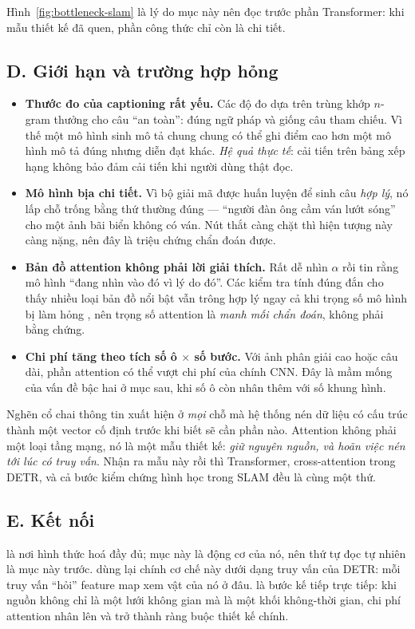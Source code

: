 \documentclass[../../../deep_learning.tex]{subfiles}
\begin{document}
Hình~\ref{fig:bottleneck-slam} là lý do mục này nên đọc trước phần Transformer: khi mẫu thiết kế đã quen, phần công thức chỉ còn là chi tiết.

\subsection{D. Giới hạn và trường hợp hỏng}

\begin{itemize}
\item \textbf{Thước đo của captioning rất yếu.} Các độ đo dựa trên trùng khớp \(n\)-gram thưởng cho câu ``an toàn'': đúng ngữ pháp và giống câu tham chiếu. Vì thế một mô hình sinh mô tả chung chung có thể ghi điểm cao hơn một mô hình mô tả đúng nhưng diễn đạt khác. \emph{Hệ quả thực tế}: cải tiến trên bảng xếp hạng không bảo đảm cải tiến khi người dùng thật đọc.
\item \textbf{Mô hình bịa chi tiết.} Vì bộ giải mã được huấn luyện để sinh câu \emph{hợp lý}, nó lấp chỗ trống bằng thứ thường đúng --- ``người đàn ông cầm ván lướt sóng'' cho một ảnh bãi biển không có ván. Nút thắt càng chặt thì hiện tượng này càng nặng, nên đây là triệu chứng chẩn đoán được.
\item \textbf{Bản đồ attention không phải lời giải thích.} Rất dễ nhìn \(\alpha\) rồi tin rằng mô hình ``đang nhìn vào đó vì lý do đó''. Các kiểm tra tính đúng đắn cho thấy nhiều loại bản đồ nổi bật vẫn trông hợp lý ngay cả khi trọng số mô hình bị làm hỏng \cite{adebayo2018sanity}, nên trọng số attention là \emph{manh mối chẩn đoán}, không phải bằng chứng.
\item \textbf{Chi phí tăng theo tích số ô \(\times\) số bước.} Với ảnh phân giải cao hoặc câu dài, phần attention có thể vượt chi phí của chính CNN. Đây là mầm mống của vấn đề bậc hai ở mục sau, khi số ô còn nhân thêm với số khung hình.
\end{itemize}

\begin{cannho}
Nghẽn cổ chai thông tin xuất hiện ở \emph{mọi} chỗ mà hệ thống nén dữ liệu có cấu trúc thành một vector cố định trước khi biết sẽ cần phần nào. Attention không phải một loại tầng mạng, nó là một mẫu thiết kế: \emph{giữ nguyên nguồn, và hoãn việc nén tới lúc có truy vấn}. Nhận ra mẫu này rồi thì Transformer, cross-attention trong DETR, và cả bước kiểm chứng hình học trong SLAM đều là cùng một thứ. 
\end{cannho}

\subsection{E. Kết nối}
 là nơi hình thức hoá đầy đủ; mục này là động cơ của nó, nên thứ tự đọc tự nhiên là mục này trước.  dùng lại chính cơ chế này dưới dạng truy vấn của DETR: mỗi truy vấn ``hỏi'' feature map xem vật của nó ở đâu.  là bước kế tiếp trực tiếp: khi nguồn không chỉ là một lưới không gian mà là một khối không-thời gian, chi phí attention nhân lên và trở thành ràng buộc thiết kế chính.
\end{document}
